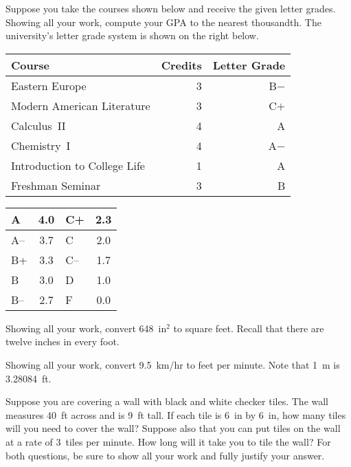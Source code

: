 \documentclass[12pt,letterpaper]{exam}
\begin{document}
\begin{questions}
\newpage
\question[10] Suppose you take the courses shown below and receive the given letter grades. Showing all your work, compute your GPA to the nearest thousandth. The university's letter grade system is shown on the right below. \par
	\begin{table}[!ht]
	\centering
	\begin{tabular}{lrr}
	Course & Credits & Letter Grade \\ \hline
	Eastern Europe & 3 & B$-$ \\
	Modern American Literature & 3 & C$+$ \\
	Calculus~II & 4 & A\phantom{$-$} \\
	Chemistry~I & 4 & A$-$ \\
	Introduction to College Life & 1 & A\phantom{$-$} \\
	Freshman Seminar & 3 & B\phantom{$-$}
	\end{tabular} \hspace{1cm}
        \begin{tabular}{|l||c|l||c|} \hline
        A & 4.0 & C+ & 2.3 \\ \hline
        A-- & 3.7 & C & 2.0 \\ \hline
        B+ & 3.3 & C-- & 1.7 \\ \hline
        B & 3.0 & D & 1.0 \\ \hline
        B-- & 2.7 & F & 0.0 \\ \hline
        \end{tabular}
	\end{table}



\newpage
\question[10] Showing all your work, convert 648~in$^2$ to square feet. Recall that there are twelve inches in every foot.



\newpage
\question[10] Showing all your work, convert 9.5~km/hr to feet per minute. Note that 1~m is 3.28084~ft.



\newpage
\question[10] Suppose you are covering a wall with black and white checker tiles. The wall measures 40~ft across and is 9~ft tall. If each tile is 6~in by 6~in, how many tiles will you need to cover the wall? Suppose also that you can put tiles on the wall at a rate of 3~tiles per minute. How long will it take you to tile the wall? For both questions, be sure to show all your work and fully justify your answer. 




\end{questions}
\end{document}
